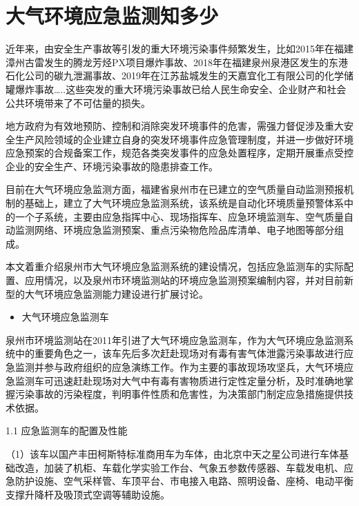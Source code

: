 \documentclass[
]{book}
\providecommand{\tightlist}{%
  \setlength{\itemsep}{0pt}\setlength{\parskip}{0pt}}
\begin{document}
\hypertarget{ux5927ux6c14ux73afux5883ux5e94ux6025ux76d1ux6d4bux77e5ux591aux5c11}{%
\section{大气环境应急监测知多少}\label{ux5927ux6c14ux73afux5883ux5e94ux6025ux76d1ux6d4bux77e5ux591aux5c11}}

近年来，由安全生产事故等引发的重大环境污染事件频繁发生，比如2015年在福建漳州古雷发生的腾龙芳烃PX项目爆炸事故、2018年在福建泉州泉港区发生的东港石化公司的碳九泄漏事故、2019年在江苏盐城发生的天嘉宜化工有限公司的化学储罐爆炸事故\ldots..这些突发的重大环境污染事故已给人民生命安全、企业财产和社会公共环境带来了不可估量的损失。

地方政府为有效地预防、控制和消除突发环境事件的危害，需强力督促涉及重大安全生产风险领域的企业建立自身的突发环境事件应急管理制度，并进一步做好环境应急预案的合规备案工作，规范各类突发事件的应急处置程序，定期开展重点受控企业的安全生产、环境污染事故的隐患排查工作。

目前在大气环境应急监测方面，福建省泉州市在已建立的空气质量自动监测预报机制的基础上，建立了大气环境应急监测系统，该系统是自动化环境质量预警体系中的一个子系统，主要由应急指挥中心、现场指挥车、应急环境监测车、空气质量自动监测网络、环境应急监测预案、重点污染物危险品库清单、电子地图等部分组成。

本文着重介绍泉州市大气环境应急监测系统的建设情况，包括应急监测车的实际配置、应用情况，以及泉州市环境监测站的环境应急监测预案编制内容，并对目前新型的大气环境应急监测能力建设进行扩展讨论。

\begin{itemize}
\tightlist
\item
  大气环境应急监测车
\end{itemize}

泉州市环境监测站在2011年引进了大气环境应急监测车，作为大气环境应急监测系统中的重要角色之一，该车先后多次赶赴现场对有毒有害气体泄露污染事故进行应急监测并参与政府组织的应急演练工作。作为主要的事故现场攻坚兵，大气环境应急监测车可迅速赶赴现场对大气中有毒有害物质进行定性定量分析，及时准确地掌握污染事故的污染程度，判明事件性质和危害性，为决策部门制定应急措施提供技术依据。

1.1 应急监测车的配置及性能

（1）该车以国产丰田柯斯特标准商用车为车体，由北京中天之星公司进行车体基础改造，加装了机柜、车载化学实验工作台、气象五参数传感器、车载发电机、应急防护设施、空气采样管、车顶平台、市电接入电路、照明设备、座椅、电动平衡支撑升降杆及吸顶式空调等辅助设施。
\end{document}
